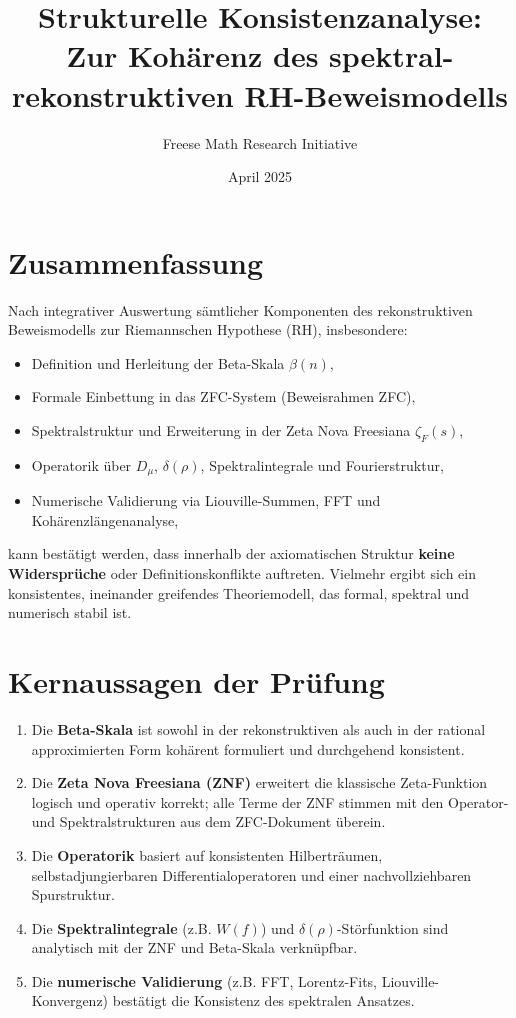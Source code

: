 \documentclass[11pt]{article}
\title{\textbf{Strukturelle Konsistenzanalyse:\\ Zur Kohärenz des spektral-rekonstruktiven RH-Beweismodells}}
\author{Freese Math Research Initiative}
\date{April 2025}
\begin{document}
\maketitle

\section*{Zusammenfassung}

Nach integrativer Auswertung sämtlicher Komponenten des rekonstruktiven Beweismodells zur Riemannschen Hypothese (RH), insbesondere:

\begin{itemize}
    \item Definition und Herleitung der Beta-Skala \(\beta(n)\),
    \item Formale Einbettung in das ZFC-System (Beweisrahmen ZFC),
    \item Spektralstruktur und Erweiterung in der Zeta Nova Freesiana \(\zeta_F(s)\),
    \item Operatorik über \(D_\mu\), \(\delta(\rho)\), Spektralintegrale und Fourierstruktur,
    \item Numerische Validierung via Liouville-Summen, FFT und Kohärenzlängenanalyse,
\end{itemize}

kann bestätigt werden, dass innerhalb der axiomatischen Struktur \textbf{keine Widersprüche} oder Definitionskonflikte auftreten. Vielmehr ergibt sich ein konsistentes, ineinander greifendes Theoriemodell, das formal, spektral und numerisch stabil ist.

\section*{Kernaussagen der Prüfung}

\begin{enumerate}
    \item Die \textbf{Beta-Skala} ist sowohl in der rekonstruktiven als auch in der rational approximierten Form kohärent formuliert und durchgehend konsistent.
    \item Die \textbf{Zeta Nova Freesiana (ZNF)} erweitert die klassische Zeta-Funktion logisch und operativ korrekt; alle Terme der ZNF stimmen mit den Operator- und Spektralstrukturen aus dem ZFC-Dokument überein.
    \item Die \textbf{Operatorik} basiert auf konsistenten Hilberträumen, selbstadjungierbaren Differentialoperatoren und einer nachvollziehbaren Spurstruktur.
    \item Die \textbf{Spektralintegrale} (z.B. \(W(f)\)) und \(\delta(\rho)\)-Störfunktion sind analytisch mit der ZNF und Beta-Skala verknüpfbar.
    \item Die \textbf{numerische Validierung} (z.B. FFT, Lorentz-Fits, Liouville-Konvergenz) bestätigt die Konsistenz des spektralen Ansatzes.
\end{enumerate}
\end{document}
